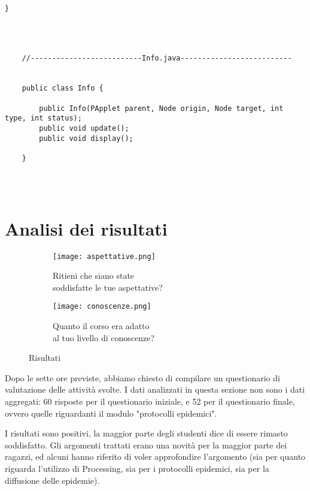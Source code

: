 \begin{lstlisting}[label={lst:library_code}, caption={La definizione delle classi principali utilizzate dai ragazzi}]
    }




    //--------------------------Info.java--------------------------
    

    public class Info {
    
        public Info(PApplet parent, Node origin, Node target, int type, int status);
        public void update();
        public void display();
    
    }
    
    
        
    \end{lstlisting}
    
\section{Analisi dei risultati}

\begin{figure}[ht]
    
    \begin{subfigure}{.5\textwidth}
        \centering
        \texttt{[image: aspettative.png]}
        \captionsetup{justification=centering}
        \caption{Ritieni che siano state \\ soddisfatte le tue aspettative?} 
    \end{subfigure}\hfill
    \begin{subfigure}{.5\textwidth}
        \centering
        \texttt{[image: conoscenze.png]}
        \captionsetup{justification=centering}
        \caption{Quanto il corso era adatto  \\ al tuo livello di conoscenze?} 
    \end{subfigure}
    \caption{Risultati}
\end{figure} 

Dopo le sette ore previste, abbiamo chiesto di compilare un questionario di valutazione delle attività svolte.  I dati analizzati in questa sezione non sono i dati aggregati: 60 risposte per il questionario iniziale, e 52 per il questionario finale, ovvero quelle riguardanti il modulo "protocolli epidemici".

I risultati sono positivi, la maggior parte degli studenti dice di essere rimasto soddisfatto. Gli argomenti trattati erano una novità per la maggior parte dei ragazzi, ed alcuni hanno riferito di voler approfondire l'argomento (sia per quanto riguarda l'utilizzo di Processing, sia per i protocolli epidemici, sia per la diffusione delle epidemie). 

